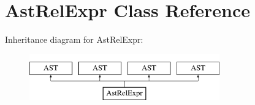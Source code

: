 \hypertarget{classAstRelExpr}{\section{Ast\-Rel\-Expr Class Reference}
\label{classAstRelExpr}
}
Inheritance diagram for Ast\-Rel\-Expr\-:\begin{figure}[H]
\begin{center}
\leavevmode
\includegraphics[height=2.000000cm]{classAstRelExpr}
\end{center}
\end{figure}
